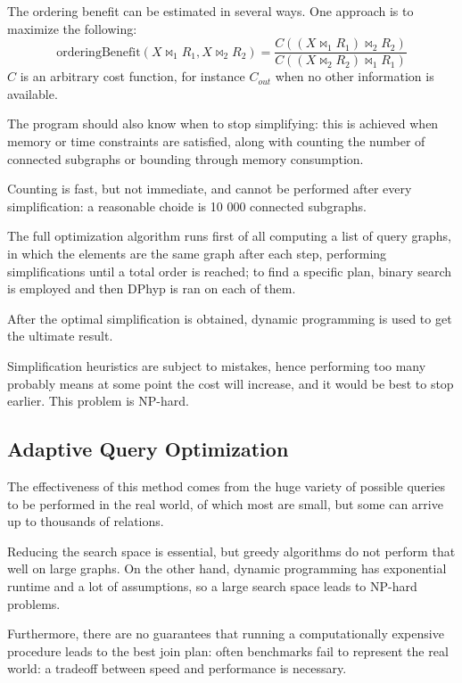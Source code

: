 The ordering benefit can be estimated in several ways. One approach is to maximize the following:
$$\text{orderingBenefit}(X \bowtie_1 R_1, X \bowtie_2 R_2) = \frac{C((X \bowtie_1 R_1) \bowtie_2 R_2)}{C((X \bowtie_2 R_2) \bowtie_1 R_1)}$$
$C$ is an arbitrary cost function, for instance $C_{out}$ when no other information is available.

The program should also know when to stop simplifying: this is achieved when memory or time constraints are satisfied, along with counting the number of connected subgraphs or bounding through memory consumption.

Counting is fast, but not immediate, and cannot be performed after every simplification: a reasonable choide is 10 000 connected subgraphs.

The full optimization algorithm runs first of all computing a list of query graphs, in which the elements are the same graph after each step, performing simplifications until a total order is reached; to find a specific plan, binary search is employed and then DPhyp is ran on each of them.

After the optimal simplification is obtained, dynamic programming is used to get the ultimate result.

Simplification heuristics are subject to mistakes, hence performing too many probably means at some point the cost will increase, and it would be best to stop earlier. This problem is NP-hard.

\subsection{Adaptive Query Optimization}
The effectiveness of this method comes from the huge variety of possible queries to be performed in the real world, of which most are small, but some can arrive up to thousands of relations.

Reducing the search space is essential, but greedy algorithms do not perform that well on large graphs. On the other hand, dynamic programming has exponential runtime and a lot of assumptions, so a large search space leads to NP-hard problems. 

Furthermore, there are no guarantees that running a computationally expensive procedure leads to the best join plan: often benchmarks fail to represent the real world: a tradeoff between speed and performance is necessary.

